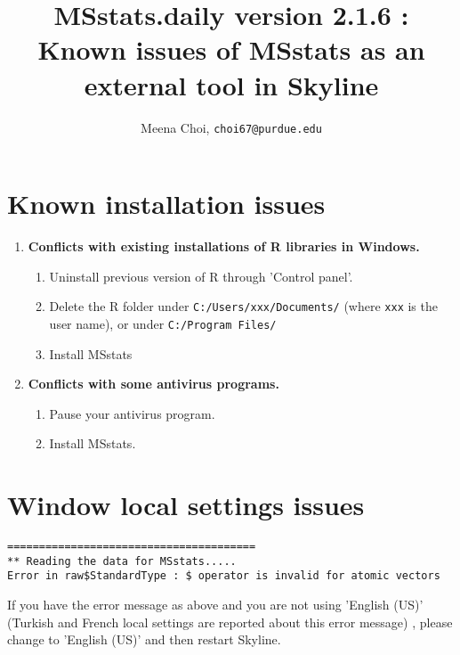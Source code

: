 \documentclass[10pt]{article}
\begin{document}
\noindent

\title{MSstats.daily version 2.1.6 : Known issues of MSstats as an external tool in Skyline}
\author{Meena Choi, {\tt choi67@purdue.edu}}
\maketitle



\section{Known installation issues}


\begin{enumerate}
\item {\bf Conflicts with existing installations of R libraries in Windows.} 
\begin{enumerate}
\item Uninstall previous version of R through 'Control panel'. 
\item Delete the R folder under {\tt C:/Users/xxx/Documents/} (where {\tt xxx} is the user name), or under {\tt C:/Program Files/}
\item Install MSstats
\end{enumerate}

\item {\bf Conflicts with some antivirus programs.} 
\begin{enumerate}
\item Pause your antivirus program. 
\item Install MSstats.
\end{enumerate}

\end{enumerate}



\section{Window local settings issues}


\begin{verbatim}
=======================================
** Reading the data for MSstats..... 
Error in raw$StandardType : $ operator is invalid for atomic vectors
\end{verbatim}

If you have the error message as above and you are not using 'English (US)' (Turkish and French local settings are reported about this error message) , please change to 'English (US)' and then restart Skyline. 
\end{document}
